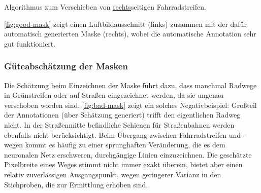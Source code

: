 \newcommand{\norm}[1]{\left\lVert#1\right\rVert}
\begin{algorithm}
	\caption{Algorithmus zum Verschieben von \underline{rechts}seitigen Fahrradstreifen.}\label{lst:move-strip}
	\begin{algorithmic}[1]
		 
				\State{$e \gets \frac{1}{\norm{ \Delta v}_2} \Delta v$}
				 
			\EndFor
		\EndProcedure
	\end{algorithmic}
\end{algorithm}

\autoref{fig:good-mask} zeigt einen Luftbildausschnitt (links) zusammen mit der dafür automatisch generierten Maske (rechts),
wobei die automatische Annotation sehr gut funktioniert. 

\subsubsection{Güteabschätzung der Masken} \label{sec:quality-of-masks}

Die Schätzung beim Einzeichnen der Maske führt dazu, dass manchmal Radwege in Grünstreifen oder auf Straßen eingezeichnet werden, da sie ungenau verschoben worden sind.
\autoref{fig:bad-mask} zeigt ein solches Negativbeispiel: Großteil der Annotationen (über Schätzung generiert) trifft den eigentlichen Radweg nicht. 
In der Straßenmitte befindliche Schienen für Straßenbahnen werden ebenfalls nicht berücksichtigt.
Beim Übergang zwischen Fahrradstreifen und -wegen kommt es häufig zu einer sprunghaften Veränderung, die es dem neuronalen Netz erschweren, durchgängige Linien einzuzeichnen.
Die geschätzte Pixelbreite eines Weges stimmt nicht immer exakt überein, bietet aber einen relativ zuverlässigen Ausgangspunkt, wegen geringerer Varianz in den Stichproben, 
die zur Ermittlung erhoben sind.

